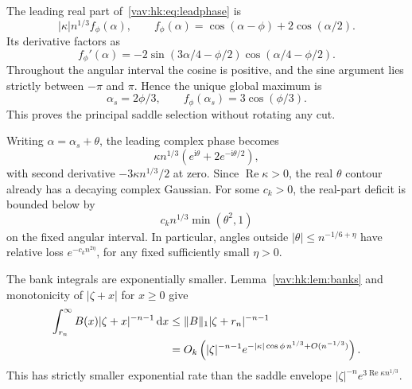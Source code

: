 \documentclass[11pt]{article}
\theoremstyle{remark}\newtheorem{remark}[theorem]{Remark}
\newcommand{\ii}{\mathrm i}
\newcommand{\dd}{\,\mathrm d}
\newcommand{\Rea}{\operatorname{Re}}
\begin{document}
The leading real part of~\eqref{vav:hk:eq:leadphase} is
\begin{equation}\label{vav:hk:eq:fphi}
 |\kappa|n^{1/3}f_\phi(\alpha),\qquad
 f_\phi(\alpha)=\cos(\alpha-\phi)+2\cos(\alpha/2).
\end{equation}
Its derivative factors as
\begin{equation}\label{vav:hk:eq:derivative}
 f_\phi'(\alpha)=-2\sin(3\alpha/4-\phi/2)
                         \cos(\alpha/4-\phi/2).
\end{equation}
Throughout the angular interval the cosine is positive, and the sine argument lies strictly between $-\pi$ and $\pi$. Hence the unique global maximum is
\[
 \alpha_s=2\phi/3,\qquad f_\phi(\alpha_s)=3\cos(\phi/3).
\]
This proves the principal saddle selection without rotating any cut.

Writing $\alpha=\alpha_s+\theta$, the leading complex phase becomes
\begin{equation}\label{vav:hk:eq:phasecentral}
 \kappa n^{1/3}\left(e^{\ii\theta}+2e^{-\ii\theta/2}\right),
\end{equation}
with second derivative $-3\kappa n^{1/3}/2$ at zero. Since $\Rea\kappa>0$, the real $\theta$ contour already has a decaying complex Gaussian. For some $c_k>0$, the real-part deficit is bounded below by
\[
 c_kn^{1/3}\min(\theta^2,1)
\]
on the fixed angular interval. In particular, angles outside
$|\theta|\leq n^{-1/6+\eta}$ have relative loss $e^{-c_kn^{2\eta}}$, for any fixed sufficiently small $\eta>0$.

The bank integrals are exponentially smaller. Lemma~\ref{vav:hk:lem:banks} and monotonicity of $|\zeta+x|$ for $x\geq0$ give
\begin{align}\label{vav:hk:eq:bankminor}
 \int_{r_n}^\infty B(x)|\zeta+x|^{-n-1}\dd x
 &\leq \|B\|_1|\zeta+r_n|^{-n-1}\notag\\
 &=O_k\left(|\zeta|^{-n-1}
 e^{-|\kappa|\cos\phi\,n^{1/3}+O(n^{-1/3})}\right).
\end{align}
This has strictly smaller exponential rate than the saddle envelope
$|\zeta|^{-n}e^{3\Rea\kappa n^{1/3}}$.
\end{document}
